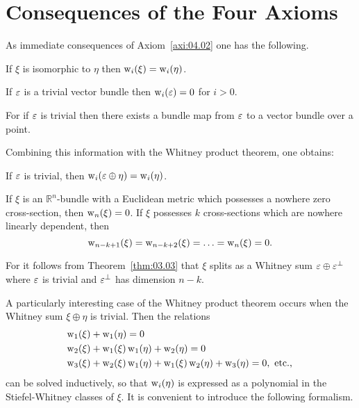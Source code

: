 \documentclass[../main]{subfiles}
\begin{document}
\section{Consequences of the Four Axioms}\label{sec:4.1}

As immediate consequences of Axiom~\ref{axi:04.02} one has the following.
\begin{proposition}\label{prop:04.01}
If $\xi$ is isomorphic to $\eta$ then $\operatorname{w}_i(\xi) = \operatorname{w}_i(\eta)$.
\end{proposition}

\begin{proposition}\label{prop:04.02}
If $\varepsilon$ is a trivial vector bundle then $\operatorname{w}_i(\varepsilon)=0$ for $i>0$.
\end{proposition}

For if $\varepsilon$ is trivial then there exists a bundle map from $\varepsilon$ to a vector bundle over a point.

Combining this information with the Whitney product theorem, one obtains:

\begin{proposition}\label{prop:04.03}
If $\varepsilon$ is trivial, then $\operatorname{w}_i(\varepsilon \oplus \eta)=\operatorname{w}_i(\eta)$.
\end{proposition}

\begin{proposition}\label{prop:04.04}
If $\xi$ is an $\mathbb{R}^{n}$-bundle with a Euclidean metric which possesses a nowhere zero cross-section, then $\operatorname{w}_{n}(\xi)=0$. If $\xi$ possesses $k$ cross-sections which are nowhere linearly dependent, then
\[
\operatorname{w}_{n-k+1}(\xi)=\operatorname{w}_{n-k+2}(\xi)=\ldots=\operatorname{w}_{n}(\xi)=0 .
\]
\end{proposition}
For it follows from Theorem~\ref{thm:03.03} that $\xi$ splits as a Whitney sum $\varepsilon \oplus \varepsilon^{\perp}$ where $\varepsilon$ is trivial and $\varepsilon^{\perp}$ has dimension $n-k$.

A particularly interesting case of the Whitney product theorem occurs when the Whitney sum $\xi \oplus \eta$ is trivial. Then the relations
\[
\begin{aligned}
&\operatorname{w}_1(\xi)+\operatorname{w}_1(\eta)=0 \\
&\operatorname{w}_2(\xi)+\operatorname{w}_1(\xi) \operatorname{w}_1(\eta)+\operatorname{w}_2(\eta)=0 \\
&\operatorname{w}_3(\xi)+\operatorname{w}_2(\xi) \operatorname{w}_1(\eta)+\operatorname{w}_1(\xi) \operatorname{w}_2(\eta)+\operatorname{w}_3(\eta)=0, \text{ etc., }
\end{aligned}
\]
can be solved inductively, so that $\operatorname{w}_{i}(\eta)$ is expressed as a polynomial in the Stiefel-Whitney classes of $\xi$. It is convenient to introduce the following formalism.
\end{document}
